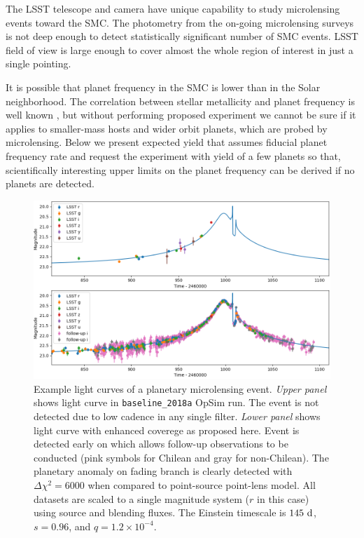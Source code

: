 \documentclass[12pt,letterpaper]{article}
\begin{document}
The LSST telescope and camera have unique capability 
to study microlensing events toward the SMC.  The photometry from the on-going 
microlensing surveys is not deep enough to detect statistically significant 
number of SMC events.  LSST field of view is large enough to cover almost 
the whole region of interest in just a single pointing.

It is possible that planet frequency in the SMC is lower than in 
the Solar neighborhood.  The correlation between stellar metallicity 
and planet frequency is well known \citep{fischervalenti05,wang15}, 
but without performing proposed experiment we cannot be sure if 
it applies to smaller-mass hosts and wider orbit planets, which are probed 
by microlensing.  Below we present expected yield that assumes fiducial 
planet frequency rate and request the experiment with yield of a few planets 
so that, scientifically interesting upper limits on 
the planet frequency can be derived if no planets are detected.





\clearpage

\begin{figure}
 \includegraphics[width=\textwidth]{plot_1}
 \caption{Example light curves of a planetary microlensing event. 
{\it Upper panel} shows light curve in {\tt baseline\_2018a} OpSim run.  
The event is not detected due to low cadence in any single filter.  
{\it Lower panel} shows light curve with enhanced coverege as proposed here. 
Event is detected early on which allows follow-up observations to be conducted 
(pink symbols for Chilean and gray for non-Chilean).  
The planetary anomaly on fading branch is clearly detected with $\Delta\chi^2 = 6000$ 
when compared to point-source point-lens model.  
All datasets are scaled to a single magnitude system ($r$ in this case) 
using source and blending fluxes.  The Einstein timescale is $145~{\rm d}$, 
$s=0.96$, and $q=1.2\times10^{-4}$. } 
\end{figure}
\end{document}
